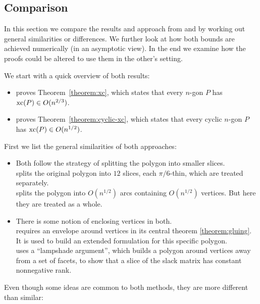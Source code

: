 \subsection{Comparison}

In this section we compare the results and approach from \cite{shitov2020sublinear} and \cite{kwan2020extension} by working out general similarities or differences. We further look at how both bounds are achieved numerically (in an asymptotic view). In the end we examine how the proofs could be altered to use them in the other's setting.

We start with a quick overview of both results:

\begin{itemize}
  \item \cite{shitov2020sublinear} proves Theorem~\ref{theorem:xc}, which states that every $n$-gon $P$ has $\operatorname{xc}(P) \in O(n^{2/3})$.
  \item \cite{kwan2020extension} proves Theorem~\ref{theorem:cyclic-xc}, which states that every cyclic $n$-gon $P$ has $\operatorname{xc}(P) \in O(n^{1/2})$.
\end{itemize}

First we list the general similarities of both approaches:

\begin{itemize}
  \item Both follow the strategy of splitting the polygon into smaller slices.\\
        \cite{shitov2020sublinear} splits the original polygon into $12$ slices, each $\pi/6$-thin, which are treated separately.\\
        \cite{kwan2020extension} splits the polygon into $O(n^{1/2})$ arcs containing $O(n^{1/2})$ vertices. But here they are treated as a whole.

  \item There is some notion of enclosing vertices in both.\\
        \cite{shitov2020sublinear} requires an envelope around vertices in its central theorem \ref{theorem:gluing}. It is used to build an extended formulation for this specific polygon.\\
        \cite{kwan2020extension} uses a ``lampshade argument'', which builds a polygon around vertices away from a set of facets, to show that a slice of the slack matrix has constant nonnegative rank.
\end{itemize}

Even though some ideas are common to both methods, they are more different than similar:

